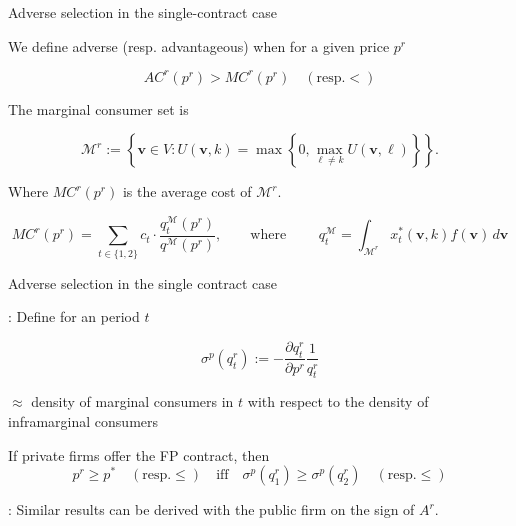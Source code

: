 \documentclass{class}
\begin{document}
\begin{frame}{Adverse selection in the single-contract case}\label{Adverse}

We define adverse (resp. advantageous) when for a given price $p^r$ 

\vfill

\[
AC^r(p^r) > MC^r(p^r) \quad (\text{resp.} <) 
\]

\vfill

The marginal consumer set is

\vfill

\[
    \mathcal{M}^r
    :=
    \left\{
    \mathbf{v}\in V:
    U(\mathbf{v},k)
    =
    \max\left\{0,\max_{\ell\neq k}U(\mathbf{v},\ell)\right\}
    \right\}.
\]

\vfill

Where $ MC^r(p^r)$ is the average cost of $\mathcal{M}^r$. 

\vfill

\[
    MC^r(p^r)
    =
    \sum_{t\in\{1,2\}}
    c_t  \cdot \frac{q^\mathcal{M}_t(p^r )
    }{q^\mathcal{M}(p^r )},  \qquad \text{where } \qquad q^\mathcal{M}_t = \int_{\mathcal{M}^r} x_t^*(\mathbf{v},k) f(\mathbf{v})\,d\mathbf{v}
\]


        \hyperlink{single}{}

\end{frame}


\begin{frame}{Adverse selection in the single contract case}

: Define for an period $t$

\[ \sigma^{p}(q_t^r):= -\frac{\partial q_t^r}{\partial p^r}\frac{1}{q_t^r} \]

{\footnotesize
 $\approx$ density of marginal consumers in $t$ with respect to the density of inframarginal consumers
}

\vfill

\begin{proposition}\label{singleresult}
If private firms offer the FP contract, then 
\[p^r \ge p^\ast \quad  (\text{resp.} \le) \quad \text{iff} \quad  \sigma^{p}(q_1^r) \ge \sigma^{p}(q_2^r) \quad (\text{resp.} \le)\]

\end{proposition}

\vfill

: Similar results can be derived with the public firm on the sign of $A^r$.
            \hyperlink{single}{}

\end{frame}
\end{document}
